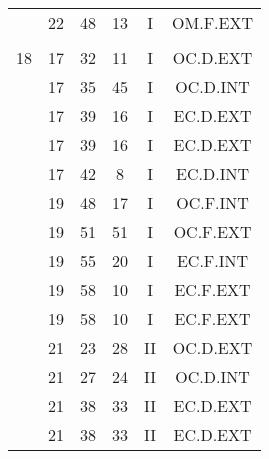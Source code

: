 \documentclass[12pt, a4paper]{article}
\begin{document}
\begin{multicols}{3}
{\begin{tabular}{c c c c c c}
	 	 	 	 & 22 & 48 & 13 & I & OM.F.EXT\\%
	 	 	 	 & & & & & \\%
	 	 	 	18 & 17 & 32 & 11 & I & OC.D.EXT\\%
	 	 	 	 & 17 & 35 & 45 & I & OC.D.INT\\%
	 	 	 	 & 17 & 39 & 16 & I & EC.D.EXT\\%
	 	 	 	 & 17 & 39 & 16 & I & EC.D.EXT\\%
	 	 	 	 & 17 & 42 & 8 & I & EC.D.INT\\%
	 	 	 	 & 19 & 48 & 17 & I & OC.F.INT\\%
	 	 	 	 & 19 & 51 & 51 & I & OC.F.EXT\\%
	 	 	 	 & 19 & 55 & 20 & I & EC.F.INT\\%
	 	 	 	 & 19 & 58 & 10 & I & EC.F.EXT\\%
	 	 	 	 & 19 & 58 & 10 & I & EC.F.EXT\\%
	 	 	 	 & 21 & 23 & 28 & II & OC.D.EXT\\%
	 	 	 	 & 21 & 27 & 24 & II & OC.D.INT\\%
	 	 	 	 & 21 & 38 & 33 & II & EC.D.EXT\\%
	 	 	 	 & 21 & 38 & 33 & II & EC.D.EXT\\%
	 	 \end{tabular}
 	}
\end{multicols}
\end{document}
